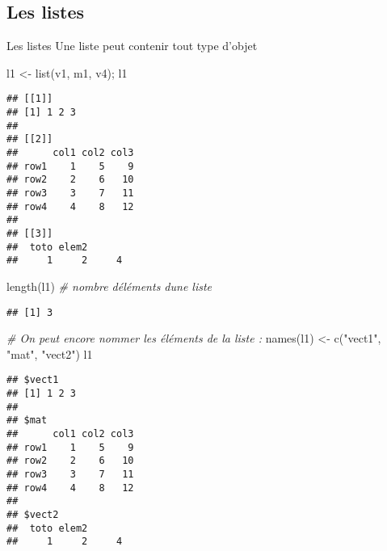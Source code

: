 \documentclass[10pt,xcolor=table,color={dvipsnames,usenames},ignorenonframetext,usepdftitle=false,french]{beamer}
\newenvironment{Shaded}{\begin{snugshade}}{\end{snugshade}}
\newcommand{\CommentTok}[1]{\textcolor[rgb]{0.56,0.35,0.01}{\textit{#1}}}
\newcommand{\FunctionTok}[1]{\textcolor[rgb]{0.00,0.00,0.00}{#1}}
\newcommand{\NormalTok}[1]{#1}
\newcommand{\OtherTok}[1]{\textcolor[rgb]{0.56,0.35,0.01}{#1}}
\newcommand{\StringTok}[1]{\textcolor[rgb]{0.31,0.60,0.02}{#1}}
\begin{document}
\hypertarget{les-listes}{%
\subsection{Les listes}\label{les-listes}}

\begin{frame}{Les listes}
\protect\hypertarget{les-listes-1}{}
Une liste peut contenir tout type d'objet

\begin{Shaded}
\begin{Highlighting}[]
\NormalTok{l1 }\OtherTok{\textless{}{-}} \FunctionTok{list}\NormalTok{(v1, m1, v4); l1}
\end{Highlighting}
\end{Shaded}

\begin{verbatim}
## [[1]]
## [1] 1 2 3
## 
## [[2]]
##      col1 col2 col3
## row1    1    5    9
## row2    2    6   10
## row3    3    7   11
## row4    4    8   12
## 
## [[3]]
##  toto elem2       
##     1     2     4
\end{verbatim}

\begin{Shaded}
\begin{Highlighting}[]
\FunctionTok{length}\NormalTok{(l1) }\CommentTok{\# nombre d\textquotesingle{}éléments d\textquotesingle{}une liste}
\end{Highlighting}
\end{Shaded}

\begin{verbatim}
## [1] 3
\end{verbatim}

\begin{Shaded}
\begin{Highlighting}[]
\CommentTok{\# On peut encore nommer les éléments de la liste :}
\FunctionTok{names}\NormalTok{(l1) }\OtherTok{\textless{}{-}} \FunctionTok{c}\NormalTok{(}\StringTok{"vect1"}\NormalTok{, }\StringTok{"mat"}\NormalTok{, }\StringTok{"vect2"}\NormalTok{)}
\NormalTok{l1}
\end{Highlighting}
\end{Shaded}

\begin{verbatim}
## $vect1
## [1] 1 2 3
## 
## $mat
##      col1 col2 col3
## row1    1    5    9
## row2    2    6   10
## row3    3    7   11
## row4    4    8   12
## 
## $vect2
##  toto elem2       
##     1     2     4
\end{verbatim}


\end{frame}
\end{document}
